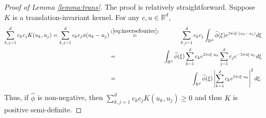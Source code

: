 \documentclass{article}
\def\RR{\mathbb R}
\numberwithin{equation}{section}
\begin{document}
\begin{appendices}
\begin{proof}[Proof of Lemma \ref{lemma:trans}]
   The proof is relatively straightforward. 
   Suppose $K$ is a translation-invariant kernel. For any $c,u\in \RR^d$, 
\begin{eqnarray*}
    \sum_{k,j=1}^d c_k c_j K(u_k,u_j) = \sum_{k,j=1}^d c_kc_j \phi(u_k-u_j) 
    &\overset{(\ref{eq:inversefourier})}{=}&  \sum_{k,j=1}^d c_k c_j \int_{\RR^d} \widehat{\phi}(\xi) e^{2\pi i\xi \cdot (u_k-u_j)} d\xi \\
    &=&  \int_{\RR^d} \widehat{\phi}(\xi)\sum_{k=1}^d c_k e^{2\pi i\xi \cdot u_k} \sum_{j=1}^d c_j  e^{-2\pi i\xi \cdot u_j} d\xi\\
     &=&  \int_{\RR^d} \widehat{\phi}(\xi)\left|\sum_{k=1}^d c_k e^{2\pi i\xi \cdot u_k}\right|^2 d\xi.
\end{eqnarray*}
Thus, if $\widehat{\phi}$ is non-negative, then  $\sum_{k,j=1}^d c_k c_j K(u_k,u_j)\geq 0$ and thus $K$ is positive semi-definite. 
\end{proof}





\end{appendices}
\end{document}
